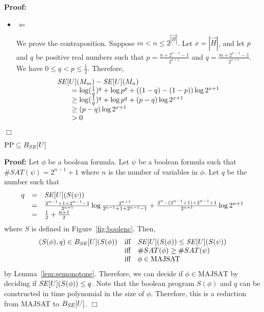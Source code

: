 \documentclass{llncs}
\newenvironment{proof}{\noindent\rm{\bf Proof:}}{\hbox{$\Box$}\vspace*{0.2\baselineskip}}
\newenvironment{reftheorem}[1]{\begin{trivlist}\item[\hskip
      \labelsep{\bf Theorem #1.}]\it}{\end{trivlist}}
\newcommand{\vect}[1]{\overrightarrow{{#1}}}
\begin{document}
\begin{proof}
\begin{itemize}
\item $\Leftarrow$

  We prove the contraposition.  Suppose $m< n\le 2^{|\vect H|}$.  Let
  $x=|{\vect H}|$, and let $p$ and $q$ be positive real numbers such
  that $p=\frac{n+2^{x-1}-1}{2^{x+1}}$ and
  $q=\frac{m+2^{x-1}-1}{2^{x+1}}$.  We have $0\le q< p\le
  \frac{1}{2}$.  Therefore,
\[
\begin{array}{l}
  {\it SE}[U](M_m)-{\it SE}[U](M_n)\\
\qquad=\log(\frac{1}{q})^q + \log p^p + ((1-q)-(1-p))\log 2^{x+1}\\
\qquad\ge\log(\frac{1}{q})^q + \log p^q + (p-q)\log 2^{x+1}\\
\qquad\ge (p-q)\log 2^{x+1}\\
\qquad> 0
\end{array}
\]
\end{itemize}
\end{proof}

\begin{reftheorem}{\ref{thm:ppse}}
$\text{PP}\subseteq B_{\it SE}[U]$
\end{reftheorem}
\begin{proof}
Let $\phi$ be a boolean formula.  Let $\psi$ be a boolean formula such
that $\#SAT(\psi)=2^{n-1}+1$ where $n$ is the number of variables in
$\phi$.  Let $q$ be the number such that
\[
\begin{array}{rcl}
  q&=&{\it SE}[U](S(\psi))\\
&=&\frac{2^{n-1}+1 + 2^{n-1}-1}{2^{n+1}}\log\frac{2^{n+1}}{2^{n-1}+1 + 2^{n-1}-1} + \frac{2^{n} -(2^{n-1}+1) + 2^{n-1}+1}{2^{n+1}}\log 2^{n+1}\\
 &=&\frac{1}{2} + \frac{n+1}{2}
\end{array}
\]
where $S$ is defined in Figure~\ref{fig:boolenc}.
Then,
\[
\begin{array}{rcl}
  (S(\phi),q)\in B_{\it SE}[U](S(\phi))&\textrm{iff}& {\it
  SE}[U](S(\phi)) \leq {\it SE}[U](S(\psi))\\
 & \textrm{iff}&\#SAT(\phi)\ge\#SAT(\psi)\\
 &\textrm{iff}& \phi\in\textrm{MAJSAT}
\end{array}
\]
by Lemma~\ref{lem:semonotone}.  Therefore, we can decide if
$\phi\in\textrm{MAJSAT}$ by deciding if ${\it SE}[U](S(\phi))\le q$.
Note that the boolean program $S(\phi)$ and $q$ can be
constructed in time polynomial in the size of $\phi$.  Therefore, this
is a reduction from \textrm{MAJSAT} to $B_{\it SE}[U]$.
\end{proof}
\end{document}
